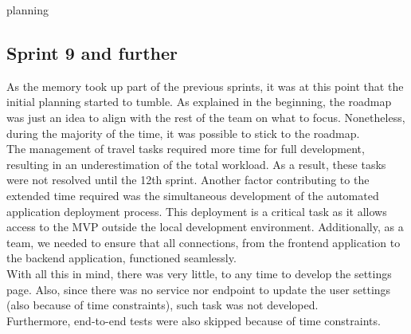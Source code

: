 planning\documentclass[../memory.tex]{subfiles}
\begin{document}
\subsection{Sprint 9 and further}
As the memory took up part of the previous sprints, it was at this point that
the initial planning started to tumble. As explained in the beginning, the
roadmap was just an idea to align with the rest of the team on what to focus.
Nonetheless, during the majority of the time, it was possible to stick to the
roadmap.
\\[8pt]
The management of travel tasks required more time for full development,
resulting in an underestimation of the total workload. As a result, these tasks
were not resolved until the 12th sprint. Another factor contributing to the
extended time required was the simultaneous development of the automated
application deployment process. This deployment is a critical task as it allows
access to the MVP outside the local development environment. Additionally, as
a team, we needed to ensure that all connections, from the frontend application
to the backend application, functioned seamlessly.
\\[8pt]
With all this in mind, there was very little, to any time to develop the
settings page. Also, since there was no service nor endpoint to update the user
settings (also because of time constraints), such task was not developed.
\\
Furthermore, end-to-end tests were also skipped because of time constraints.
\end{document}
